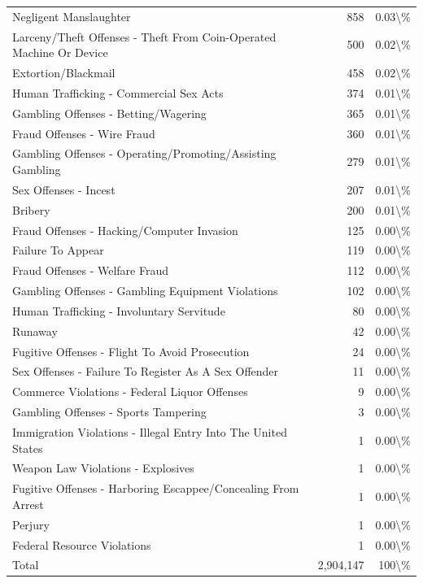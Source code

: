 \documentclass[
  12pt,
  openany]{book}
\begin{document}
\begin{longtable}[t]{lrr}
Negligent Manslaughter & 858 & 0.03\textbackslash{}\%\\
\addlinespace
Larceny/Theft Offenses - Theft From Coin-Operated Machine Or Device & 500 & 0.02\textbackslash{}\%\\
Extortion/Blackmail & 458 & 0.02\textbackslash{}\%\\
Human Trafficking - Commercial Sex Acts & 374 & 0.01\textbackslash{}\%\\
Gambling Offenses - Betting/Wagering & 365 & 0.01\textbackslash{}\%\\
Fraud Offenses - Wire Fraud & 360 & 0.01\textbackslash{}\%\\
\addlinespace
Gambling Offenses - Operating/Promoting/Assisting Gambling & 279 & 0.01\textbackslash{}\%\\
Sex Offenses - Incest & 207 & 0.01\textbackslash{}\%\\
Bribery & 200 & 0.01\textbackslash{}\%\\
Fraud Offenses - Hacking/Computer Invasion & 125 & 0.00\textbackslash{}\%\\
Failure To Appear & 119 & 0.00\textbackslash{}\%\\
\addlinespace
Fraud Offenses - Welfare Fraud & 112 & 0.00\textbackslash{}\%\\
Gambling Offenses - Gambling Equipment Violations & 102 & 0.00\textbackslash{}\%\\
Human Trafficking - Involuntary Servitude & 80 & 0.00\textbackslash{}\%\\
Runaway & 42 & 0.00\textbackslash{}\%\\
Fugitive Offenses - Flight To Avoid Prosecution & 24 & 0.00\textbackslash{}\%\\
\addlinespace
Sex Offenses - Failure To Register As A Sex Offender & 11 & 0.00\textbackslash{}\%\\
Commerce Violations - Federal Liquor Offenses & 9 & 0.00\textbackslash{}\%\\
Gambling Offenses - Sports Tampering & 3 & 0.00\textbackslash{}\%\\
Immigration Violations - Illegal Entry Into The United States & 1 & 0.00\textbackslash{}\%\\
Weapon Law Violations - Explosives & 1 & 0.00\textbackslash{}\%\\
\addlinespace
Fugitive Offenses - Harboring Escappee/Concealing From Arrest & 1 & 0.00\textbackslash{}\%\\
Perjury & 1 & 0.00\textbackslash{}\%\\
Federal Resource Violations & 1 & 0.00\textbackslash{}\%\\
Total & 2,904,147 & 100\textbackslash{}\%\\
\bottomrule
\end{longtable}
\end{document}
